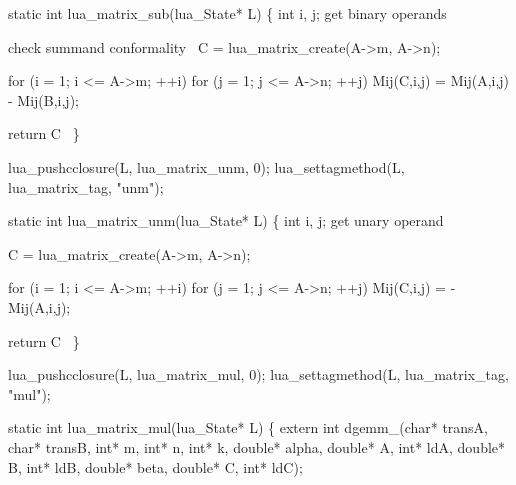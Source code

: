 \nwenddocs{}\plusendmoddef
static int lua_matrix_sub(lua_State* L)
\{
    int i, j;
    \LA{}get binary operands~{\nwtagstyle{}}\RA{}

    \LA{}check summand conformality~{\nwtagstyle{}}\RA{}
    C = lua_matrix_create(A->m, A->n);

    for (i = 1; i <= A->m; ++i)
        for (j = 1; j <= A->n; ++j)
            Mij(C,i,j) = Mij(A,i,j) - Mij(B,i,j);

    \LA{}return \code{}C\edoc{}~{\nwtagstyle{}}\RA{}
\}

\nwendcode{}\nwdocspar

\nwenddocs{}\plusendmoddef
lua_pushcclosure(L, lua_matrix_unm, 0);
lua_settagmethod(L, lua_matrix_tag, "unm");
\nwendcode{}\nwdocspar

\nwenddocs{}\plusendmoddef
static int lua_matrix_unm(lua_State* L)
\{
    int i, j;
    \LA{}get unary operand~{\nwtagstyle{}}\RA{}

    C = lua_matrix_create(A->m, A->n);

    for (i = 1; i <= A->m; ++i)
        for (j = 1; j <= A->n; ++j)
            Mij(C,i,j) = -Mij(A,i,j);

    \LA{}return \code{}C\edoc{}~{\nwtagstyle{}}\RA{}
\}

\nwendcode{}\nwdocspar

\nwenddocs{}\plusendmoddef
lua_pushcclosure(L, lua_matrix_mul, 0);
lua_settagmethod(L, lua_matrix_tag, "mul");
\nwendcode{}\nwdocspar

\nwenddocs{}\plusendmoddef
static int lua_matrix_mul(lua_State* L)
\{
    extern int dgemm_(char* transA, char* transB, int* m, int* n, int* k,
                      double* alpha, double* A, int* ldA,
                      double* B, int* ldB,
                      double* beta, double* C, int* ldC);


